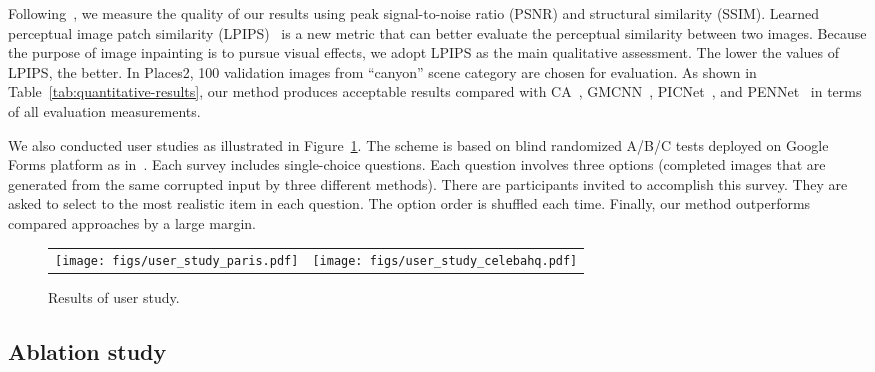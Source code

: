 \documentclass[journal]{IEEEtran}
\begin{document}
Following~\cite{contextual-attention,GMCNN}, we measure the quality of our results using peak signal-to-noise ratio (PSNR) and structural similarity (SSIM). Learned perceptual image patch similarity (LPIPS)~\cite{LPIPS} is a new metric that can better evaluate the perceptual similarity between two images. Because the purpose of image inpainting is to pursue visual effects, we adopt LPIPS as the main qualitative assessment. The lower the values of LPIPS, the better. In Places2, 100 validation images from ``canyon'' scene category are chosen for evaluation. As shown in Table~\ref{tab:quantitative-results}, our method produces acceptable results compared with CA~\cite{contextual-attention}, GMCNN~\cite{GMCNN}, PICNet~\cite{PICNet}, and PENNet~\cite{PEN-Net} in terms of all evaluation measurements. 

We also conducted user studies as illustrated in Figure~\ref{fig:user-study}. The scheme is based on blind randomized A/B/C tests deployed on Google Forms platform as in~\cite{GMCNN}. Each survey includes  single-choice questions. Each question involves three options (completed images that are generated from the same corrupted input by three different methods). There are  participants invited to accomplish this survey. They are asked to select to the most realistic item in each question. The option order is shuffled each time. Finally, our method outperforms compared approaches by a large margin.

\begin{figure}[htpb]
	\centering
	\begin{tabular}{cc}
		\texttt{[image: figs/user\_study\_paris.pdf]} &
		\texttt{[image: figs/user\_study\_celebahq.pdf]} \\
	\end{tabular}
	\caption{Results of user study.}
	\label{fig:user-study}
\end{figure}

\subsection{Ablation study}

\begin{table}[htpb]
	\centering
	\caption{Quantitative results of different structures on Paris street view dataset (center regular mask).}
	\label{tab:different-structures}
\end{table}
\end{document}
